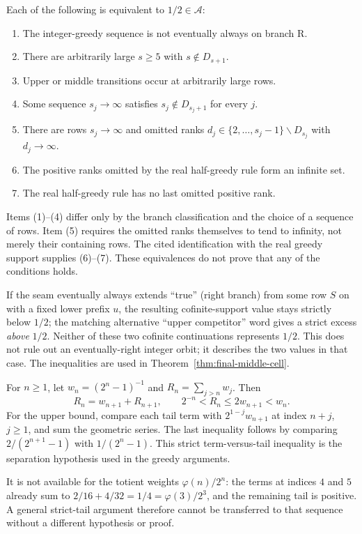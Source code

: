 \begin{thm}
\label{thm:nine-way-hub}
Each of the following is equivalent to $1/2\in\mathcal A$:
\begin{enumerate}[label=(\arabic*),nosep]
\item The integer-greedy sequence is not eventually always on branch $\mathrm R$.
\item There are arbitrarily large $s\ge5$ with $s\notin D_{s+1}$.
\item Upper or middle transitions occur at arbitrarily large rows.
\item Some sequence $s_j\to\infty$ satisfies $s_j\notin D_{s_j+1}$ for every $j$.
\item There are rows $s_j\to\infty$ and omitted ranks
$d_j\in\{2,\ldots,s_j-1\}\smallsetminus D_{s_j}$ with $d_j\to\infty$.
\item The positive ranks omitted by the real half-greedy rule form an infinite set.
\item The real half-greedy rule has no last omitted positive rank.
\end{enumerate}
\end{thm}
Items (1)--(4) differ only by the branch classification and the choice
of a sequence of rows.  Item (5) requires the omitted ranks themselves
to tend to infinity, not merely their containing rows.  The cited
identification with the real greedy support supplies (6)--(7).
These equivalences do not prove that any of the conditions holds.

\begin{lem}
\label{lem:eventually-right-impossible}
If the seam eventually always extends ``true'' (right branch) from some row $S$ on with a
fixed lower prefix $u$, the resulting cofinite-support value stays strictly below $1/2$; the matching
alternative ``upper competitor'' word gives a strict excess \emph{above} $1/2$. Neither of these two cofinite continuations represents $1/2$.
This does not rule out an eventually-right integer orbit; it describes
the two values in that case.  The inequalities are used in
Theorem~\ref{thm:final-middle-cell}.
\end{lem}

\begin{lem}
\label{lem:mersenne-tail-weight}
For $n\ge1$, let $w_n=(2^n-1)^{-1}$ and
$R_n=\sum_{j>n}w_j$.  Then
\[
 R_n=w_{n+1}+R_{n+1},\qquad
 2^{-n}<R_n\le2w_{n+1}<w_n.
\]
For the upper bound, compare each tail term with
$2^{1-j}w_{n+1}$ at index $n+j$, $j\ge1$, and sum the
geometric series.  The last inequality follows by comparing
$2/(2^{n+1}-1)$ with $1/(2^n-1)$.
This strict term-versus-tail inequality is the separation hypothesis
used in the greedy arguments.

It is not available for the totient weights $\varphi(n)/2^n$:
the terms at indices $4$ and $5$ already sum to
$2/16+4/32=1/4=\varphi(3)/2^3$, and the remaining tail is
positive.  A general strict-tail argument therefore cannot be
transferred to that sequence without a different hypothesis or
proof.
\end{lem}

